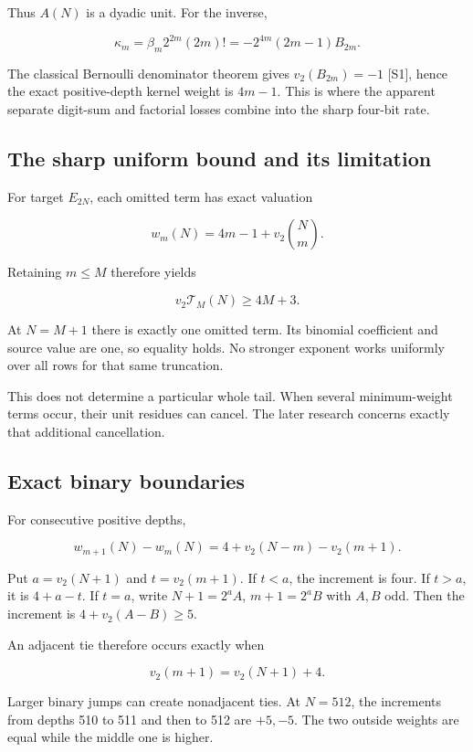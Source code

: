 \documentclass[11pt,letterpaper]{article}
\begin{document}
Thus \(A(N)\) is a dyadic unit. For the inverse,

\[
\kappa_m=\beta_m2^{2m}(2m)!
=-2^{4m}(2m-1)B_{2m}.
\]

The classical Bernoulli denominator theorem gives \(v_2(B_{2m})=-1\) {[}S1{]}, hence the exact positive-depth kernel weight is \(4m-1\). This is where the apparent separate digit-sum and factorial losses combine into the sharp four-bit rate.

\subsection{The sharp uniform bound and its limitation}\label{the-sharp-uniform-bound-and-its-limitation}

For target \(E_{2N}\), each omitted term has exact valuation

\[
w_m(N)=4m-1+v_2\binom Nm.
\]

Retaining \(m\le M\) therefore yields

\[
\boxed{v_2\mathcal T_M(N)\ge4M+3.}
\]

At \(N=M+1\) there is exactly one omitted term. Its binomial coefficient and source value are one, so equality holds. No stronger exponent works uniformly over all rows for that same truncation.

This does not determine a particular whole tail. When several minimum-weight terms occur, their unit residues can cancel. The later research concerns exactly that additional cancellation.

\subsection{Exact binary boundaries}\label{exact-binary-boundaries}

For consecutive positive depths,

\[
\boxed{w_{m+1}(N)-w_m(N)
=4+v_2(N-m)-v_2(m+1).}
\]

Put \(a=v_2(N+1)\) and \(t=v_2(m+1)\). If \(t<a\), the increment is four. If \(t>a\), it is \(4+a-t\). If \(t=a\), write \(N+1=2^aA\), \(m+1=2^aB\) with \(A,B\) odd. Then the increment is \(4+v_2(A-B)\ge5\).

An adjacent tie therefore occurs exactly when

\[
\boxed{v_2(m+1)=v_2(N+1)+4.}
\]

Larger binary jumps can create nonadjacent ties. At \(N=512\), the increments from depths 510 to 511 and then to 512 are \(+5,-5\). The two outside weights are equal while the middle one is higher.
\end{document}
